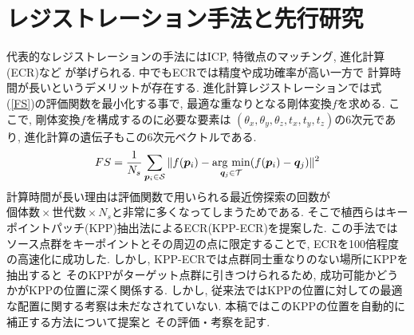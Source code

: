 \documentclass[twocolumn, 9pt, a4j, dvipdfmx]{jsarticle}
\newcommand{\argmin}{\mathop{\rm arg~min}\limits}
\begin{document}
\section{レジストレーション手法と先行研究}
代表的なレジストレーションの手法にはICP, 特徴点のマッチング, 進化計算(ECR)など
が挙げられる. 
中でもECRでは精度や成功確率が高い一方で
計算時間が長いというデメリットが存在する. 
進化計算レジストレーションでは式(\ref{FS})の評価関数を最小化する事で, 
最適な重なりとなる剛体変換$f$を求める.
ここで, 剛体変換$f$を構成するのに必要な要素は
$(\theta_x, \theta_y, \theta_z ,t_x, t_y, t_z)$の6次元であり, 
進化計算の遺伝子もこの6次元ベクトルである. 
\begin{equation}
    \label{FS}
    FS = \frac{1}{N_s} \sum_{\bm{p}_i \in \mathcal{S}}
        \| f(\bm{p}_i) - \argmin_{\bm{q}_j \in\mathcal{T}}(f(\bm{p}_i) - \bm{q}_j) \|^2
\end{equation}
計算時間が長い理由は評価関数で用いられる最近傍探索の回数が
$個体数 \times 世代数 \times N_s$と非常に多くなってしまうためである. 
そこで植西ら\cite{KPP}はキーポイントパッチ(KPP)抽出法によるECR(KPP-ECR)を提案した.
この手法ではソース点群をキーポイントとその周辺の点に限定することで, 
ECRを100倍程度の高速化に成功した. 
しかし, 
KPP-ECRでは点群同士重なりのない場所にKPPを抽出すると
そのKPPがターゲット点群に引きつけられるため, 
成功可能かどうかがKPPの位置に深く関係する.
しかし, 従来法ではKPPの位置に対しての最適な配置に関する考察は未だなされていない. 
本稿ではこのKPPの位置を自動的に補正する方法について提案と
その評価・考察を記す.
\end{document}
